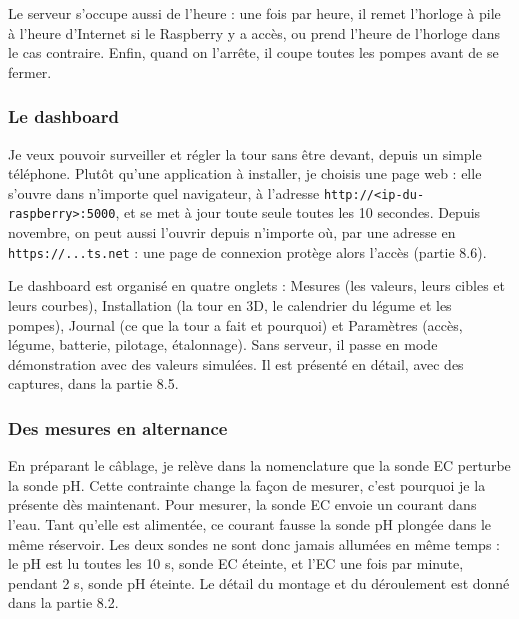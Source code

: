 Le serveur s'occupe aussi de l'heure : une fois par heure, il remet l'horloge à pile à l'heure d'Internet si le Raspberry y a accès, ou prend l'heure de l'horloge dans le cas contraire. Enfin, quand on l'arrête, il coupe toutes les pompes avant de se fermer.

\subsubsection*{Le dashboard}

Je veux pouvoir surveiller et régler la tour sans être devant, depuis un simple téléphone. Plutôt qu'une application à installer, je choisis une page web : elle s'ouvre dans n'importe quel navigateur, à l'adresse \texttt{http://<ip-du-raspberry>:5000}, et se met à jour toute seule toutes les 10 secondes. Depuis novembre, on peut aussi l'ouvrir depuis n'importe où, par une adresse en \texttt{https://...ts.net} : une page de connexion protège alors l'accès (partie 8.6).

Le dashboard est organisé en quatre onglets : Mesures (les valeurs, leurs cibles et leurs courbes), Installation (la tour en 3D, le calendrier du légume et les pompes), Journal (ce que la tour a fait et pourquoi) et Paramètres (accès, légume, batterie, pilotage, étalonnage). Sans serveur, il passe en mode démonstration avec des valeurs simulées. Il est présenté en détail, avec des captures, dans la partie 8.5.

\subsubsection*{Des mesures en alternance}

En préparant le câblage, je relève dans la nomenclature que la sonde EC perturbe la sonde pH. Cette contrainte change la façon de mesurer, c'est pourquoi je la présente dès maintenant. Pour mesurer, la sonde EC envoie un courant dans l'eau. Tant qu'elle est alimentée, ce courant fausse la sonde pH plongée dans le même réservoir. Les deux sondes ne sont donc jamais allumées en même temps : le pH est lu toutes les 10 s, sonde EC éteinte, et l'EC une fois par minute, pendant 2 s, sonde pH éteinte. Le détail du montage et du déroulement est donné dans la partie 8.2.

